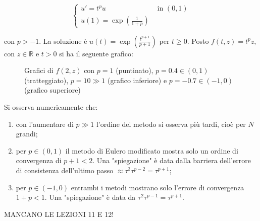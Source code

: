\documentclass[hidelinks, 10pt]{report}
\begin{document}
\[
\begin{cases}
u' = t^{p} u & \text{ in } (0, 1) \\
u(1) = \exp \left( \frac{1}{1 + p} \right) 
\end{cases}
\]

con $ p > -1 $. La soluzione \`e $ u(t) = \exp \left( \frac{t^{p + 1}}{p + 1} \right) $ per $ t \ge 0 $. Posto $ f(t, z) = t^{p} z $, con $ z \in \mathbb{R} $ e $ t > 0 $ si ha il seguente grafico:

\begin{center}
\begin{figure}[H]

\caption{Grafici di $ f(2, z) $ con $ p = 1 $ (puntinato), $ p = 0.4 \in (0, 1) $ (tratteggiato), $ p = 10 \gg 1 $ (grafico inferiore) e $ p = -0.7 \in (-1, 0) $ (grafico superiore)}
\end{figure}
\end{center}

Si osserva numericamente che:
\begin{enumerate}
\item con l'aumentare di $ p \gg 1 $ l'ordine del metodo si osserva pi\`u tardi, cio\`e per $ N $ grandi;
\item per $ p \in (0, 1) $ il metodo di Eulero modificato mostra solo un ordine di convergenza di $ p + 1 < 2 $. Una "spiegazione" \`e data dalla barriera dell'errore di consistenza dell'ultimo passo $ \approx \tau^{3} \tau^{p - 2} = \tau^{p + 1} $;
\item per $ p \in (-1, 0) $ entrambi i metodi mostrano solo l'errore di convergenza $ 1 + p < 1 $. Una "spiegazione" \`e data da $ \tau^{2} \tau^{p - 1} = \tau^{p + 1} $.
\end{enumerate}


										MANCANO LE LEZIONI 11 E 12!
\end{document}
